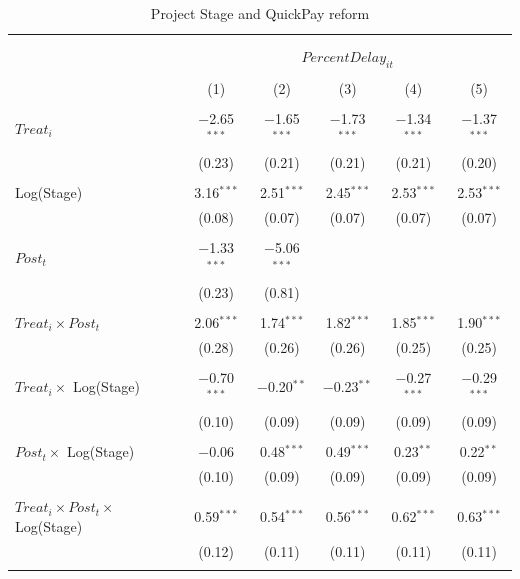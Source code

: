 \documentclass[
]{article}
\begin{document}
\begin{table}[H] \centering 
  \caption{Project Stage and QuickPay reform} 
  \label{} 
\small 
\begin{tabular}{@{\extracolsep{-2pt}}lccccc} 
\\[-1.8ex]\hline 
\hline \\[-1.8ex] 
\\[-1.8ex] & \multicolumn{5}{c}{$PercentDelay_{it}$  } \\ 
\\[-1.8ex] & (1) & (2) & (3) & (4) & (5)\\ 
\hline \\[-1.8ex] 
 $Treat_i$ & $-$2.65$^{***}$ & $-$1.65$^{***}$ & $-$1.73$^{***}$ & $-$1.34$^{***}$ & $-$1.37$^{***}$ \\ 
  & (0.23) & (0.21) & (0.21) & (0.21) & (0.20) \\ 
  & & & & & \\ 
 Log(Stage) & 3.16$^{***}$ & 2.51$^{***}$ & 2.45$^{***}$ & 2.53$^{***}$ & 2.53$^{***}$ \\ 
  & (0.08) & (0.07) & (0.07) & (0.07) & (0.07) \\ 
  & & & & & \\ 
 $Post_t$ & $-$1.33$^{***}$ & $-$5.06$^{***}$ &  &  &  \\ 
  & (0.23) & (0.81) &  &  &  \\ 
  & & & & & \\ 
 $Treat_i \times Post_t$ & 2.06$^{***}$ & 1.74$^{***}$ & 1.82$^{***}$ & 1.85$^{***}$ & 1.90$^{***}$ \\ 
  & (0.28) & (0.26) & (0.26) & (0.25) & (0.25) \\ 
  & & & & & \\ 
 $Treat_i \times$ Log(Stage) & $-$0.70$^{***}$ & $-$0.20$^{**}$ & $-$0.23$^{**}$ & $-$0.27$^{***}$ & $-$0.29$^{***}$ \\ 
  & (0.10) & (0.09) & (0.09) & (0.09) & (0.09) \\ 
  & & & & & \\ 
 $Post_t \times$ Log(Stage) & $-$0.06 & 0.48$^{***}$ & 0.49$^{***}$ & 0.23$^{**}$ & 0.22$^{**}$ \\ 
  & (0.10) & (0.09) & (0.09) & (0.09) & (0.09) \\ 
  & & & & & \\ 
 $Treat_i \times Post_t \times$ Log(Stage) & 0.59$^{***}$ & 0.54$^{***}$ & 0.56$^{***}$ & 0.62$^{***}$ & 0.63$^{***}$ \\ 
  & (0.12) & (0.11) & (0.11) & (0.11) & (0.11) \\ 
  & & & & & \\ 

\end{tabular}
\end{table}
\end{document}
